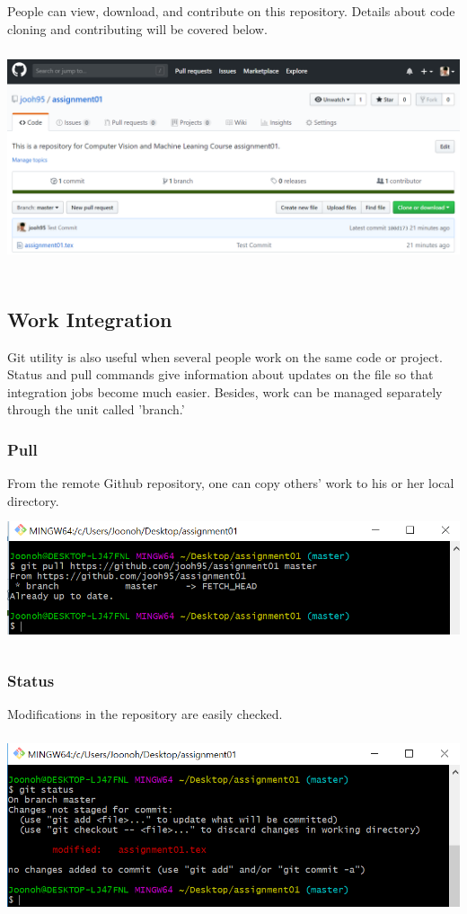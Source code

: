 \documentclass[18pt]{article}%
\begin{document}
People can view, download, and contribute on this repository. Details about code cloning and contributing will be covered below.\\
\includegraphics[height=7cm]{upload.PNG}


\subsection {Work Integration}
Git utility is also useful when several people work on the same code or project. Status and pull commands give information about updates on the file so that integration jobs become much easier. Besides, work can be managed separately through the unit called 'branch.'


\subsubsection {Pull}
From the remote Github repository, one can copy others' work to his or her local directory.\\
\includegraphics[height=4cm]{pull.PNG}

\subsubsection {Status}
Modifications in the repository are easily checked.\\
\includegraphics[height=6cm]{status.PNG}
\end{document}
